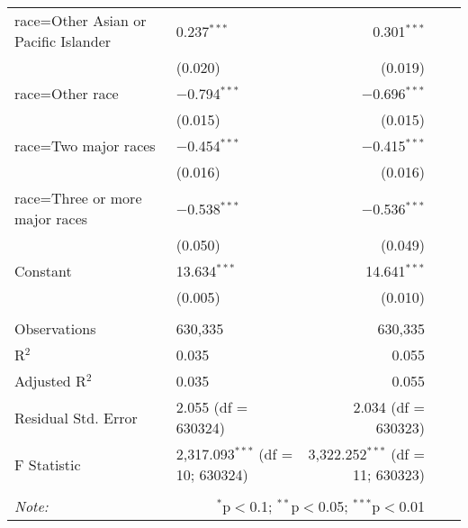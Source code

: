 \begin{longtable}{ll|rrr}
        race=Other Asian or Pacific Islander & 0.237$^{***}$ & 0.301$^{***}$ \\
        & (0.020) & (0.019) \\ 
        race=Other race & $-$0.794$^{***}$ & $-$0.696$^{***}$ \\ 
        & (0.015) & (0.015) \\ 
        race=Two major races & $-$0.454$^{***}$ & $-$0.415$^{***}$ \\ 
        & (0.016) & (0.016) \\ 
        race=Three or more major races & $-$0.538$^{***}$ & $-$0.536$^{***}$ \\
        & (0.050) & (0.049) \\ 
        Constant & 13.634$^{***}$ & 14.641$^{***}$ \\ 
        & (0.005) & (0.010) \\ 
        \hline \\[-4ex] 
        Observations & 630,335 & 630,335 \\ 
        R$^{2}$ & 0.035 & 0.055 \\ 
        Adjusted R$^{2}$ & 0.035 & 0.055 \\ 
        Residual Std. Error & 2.055 (df = 630324) & 2.034 (df = 630323) \\ 
        F Statistic & 2,317.093$^{***}$ (df = 10; 630324) & 3,322.252$^{***}$ (df = 11; 630323) \\ 
    \hline 
    \hline \\[-4ex] 
    \textit{Note:}  & \multicolumn{2}{r}{$^{*}$p$<$0.1; $^{**}$p$<$0.05; $^{***}$p$<$0.01} \\ 
    \end{longtable}
    \endgroup
\newpage
    \begingroup\tiny
